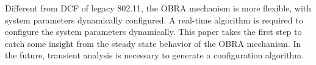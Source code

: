 \documentclass[journal]{IEEEtran}
\begin{document}
Different from DCF of legacy 802.11, the OBRA mechanism is more flexible, with system parameters dynamically configured.
A real-time algorithm is required to configure the system parameters dynamically. 
This paper takes the first step to catch some insight from the steady state behavior of the OBRA mechanism.
In the future, transient analysis is necessary to generate a configuration algorithm.



%
%
\end{document}
